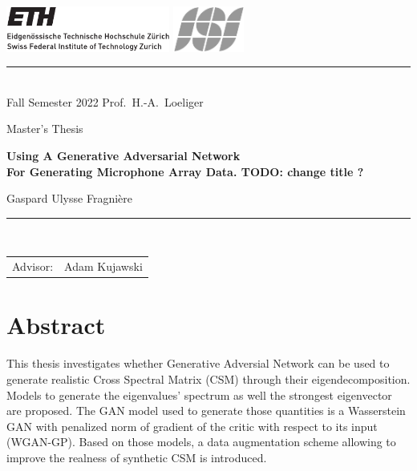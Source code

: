 \documentclass[11pt,a4paper,twoside]{report}
\begin{document}
\pagestyle{plain}
\lfoot{}
\cfoot{\thepage}
\rfoot{}
     
\begin{titlepage}
  \begin{center}
    \includegraphics[height=15mm]{resources/ethlogo} 
    \hfill
    \includegraphics[height=15mm]{resources/isilogo_plain_bw}

    \rule{\textwidth}{0.5pt}\\[1ex]
    {\Large Fall Semester 2022 \hfill 
      Prof.~H.-A.~Loeliger
    }

    \LARGE
    Master's Thesis

    \Huge\textbf{
      Using A Generative Adversarial Network\\
      For Generating Microphone Array Data. TODO: change title ?
    }

    
    \LARGE{
      Gaspard Ulysse Fragnière
    }
    
  \end{center}
  \rule{\textwidth}{0.5pt}\\[2ex]
  \noindent
  \begin{tabular}{@{}ll@{}}
    \Large Advisor: & \Large Adam Kujawski\\[1ex]
  \end{tabular}
\end{titlepage}


\cleardoublepage

\thispagestyle{empty}
\chapter*{Abstract}

This thesis investigates whether Generative Adversial Network can be used to generate realistic Cross Spectral Matrix (CSM) through their eigendecomposition. Models to generate the eigenvalues' spectrum as well the strongest eigenvector are proposed. The GAN model used to generate those quantities is a Wasserstein GAN with penalized norm of gradient of the critic with respect to its input (WGAN-GP). Based on those models, a data augmentation scheme allowing to improve the realness of synthetic CSM is introduced. 
\end{document}
